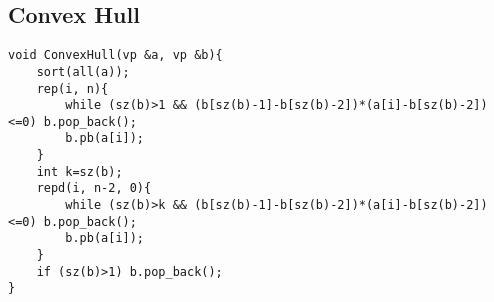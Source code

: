 \subsection{Convex Hull}
\begin{lstlisting}
void ConvexHull(vp &a, vp &b){   
    sort(all(a)); 
    rep(i, n){
        while (sz(b)>1 && (b[sz(b)-1]-b[sz(b)-2])*(a[i]-b[sz(b)-2])<=0) b.pop_back();
        b.pb(a[i]);
    }
    int k=sz(b);
    repd(i, n-2, 0){
        while (sz(b)>k && (b[sz(b)-1]-b[sz(b)-2])*(a[i]-b[sz(b)-2])<=0) b.pop_back();
        b.pb(a[i]);
    }
    if (sz(b)>1) b.pop_back();
}

\end{lstlisting}
